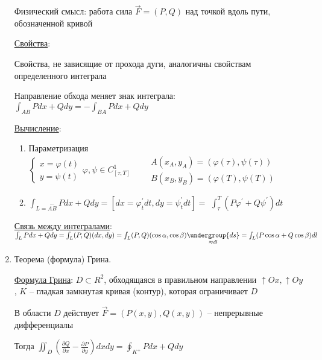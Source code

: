 \documentclass[12pt]{article}
\begin{document}
\begin{enumerate}
        Физический смысл: работа сила $\vec{F} = (P, Q)$ над точкой вдоль пути, обозначенной кривой

        \hyperlink{curvilinearintegraloffirstkindproperties}{Свойства}:

        Свойства, не зависящие от прохода дуги, аналогичны свойствам определенного интеграла

        Направление обхода меняет знак интеграла: $\int_{AB}Pdx + Qdy = -\int_{BA}Pdx + Qdy$

        \hyperlink{curvilinearintegraloffirstkindcalculation}{Вычисление}:

        \begin{enumerate}
            \item Параметризация $\begin{cases}
                x = \varphi(t) \\
                y = \psi(t)
            \end{cases} \varphi, \psi \in C^1_{[\tau, T]} \quad\quad \begin{matrix}
                A(x_A, y_A) = (\varphi(\tau), \psi(\tau)) \\
                B(x_B, y_B) = (\varphi(T), \psi(T))
            \end{matrix}$

            \item $\int_{L = \overset{\frown}{AB}}Pdx + Qdy = [dx = \varphi_t^\prime dt, dy = \psi_t^\prime dt] = $
            $\int_\tau^T (P\varphi^\prime + Q\psi^\prime)dt$
        \end{enumerate}


        \hyperlink{connectionbetweencurvilinearintegrals}{Связь между интегралами}: $\int_L Pdx + Qdy = \int_L (P, Q)(dx, dy) = \int_L (P, Q) (\cos\alpha, \cos\beta) \underset{\approx dl}{\undergroup{ds}} = \int_L (P\cos\alpha + Q\cos\beta)dl$

        \item Теорема (формула) Грина.

        \hyperlink{formulaGreen}{Формула Грина}: $D \subset R^2$, обходящаяся в правильном направлении $\uparrow Ox, \uparrow Oy$, $K$ -- гладкая замкнутая кривая (контур), которая ограничивает $D$

        В области $D$ действует $\vec{F} = (P(x, y), Q(x, y))$ -- непрерывные дифференциалы

        Тогда $\iint_D \left(\frac{\partial Q}{\partial x} - \frac{\partial P}{\partial y}\right) dxdy = \oint_{K^+} Pdx + Qdy$


\end{enumerate}
\end{document}
